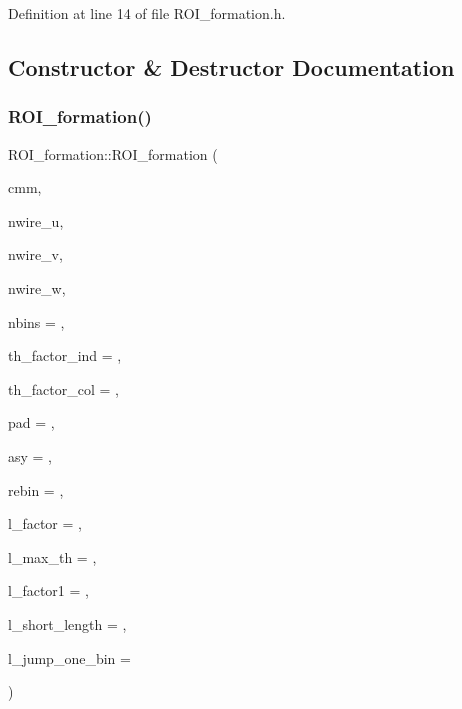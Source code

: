 Definition at line 14 of file R\+O\+I\+\_\+formation.\+h.



\subsection{Constructor \& Destructor Documentation}
\mbox{\label{class_wire_cell_1_1_sig_proc_1_1_r_o_i__formation_a9cd892f818e482c3eca9cbd7bca02c64}} 
\subsubsection{\texorpdfstring{R\+O\+I\+\_\+formation()}{ROI\_formation()}}
{\footnotesize\ttfamily R\+O\+I\+\_\+formation\+::\+R\+O\+I\+\_\+formation (\begin{DoxyParamCaption}\item[{\hyperlink{namespace_wire_cell_1_1_waveform_a18b9ae61c858e340252ba3ac83ac3bc0}{Waveform\+::\+Channel\+Mask\+Map} \&}]{cmm,  }\item[{int}]{nwire\+\_\+u,  }\item[{int}]{nwire\+\_\+v,  }\item[{int}]{nwire\+\_\+w,  }\item[{int}]{nbins = {},  }\item[{float}]{th\+\_\+factor\+\_\+ind = {},  }\item[{float}]{th\+\_\+factor\+\_\+col = {},  }\item[{int}]{pad = {},  }\item[{float}]{asy = {},  }\item[{int}]{rebin = {},  }\item[{double}]{l\+\_\+factor = {},  }\item[{double}]{l\+\_\+max\+\_\+th = {},  }\item[{double}]{l\+\_\+factor1 = {},  }\item[{int}]{l\+\_\+short\+\_\+length = {},  }\item[{int}]{l\+\_\+jump\+\_\+one\+\_\+bin = {} }\end{DoxyParamCaption})}



